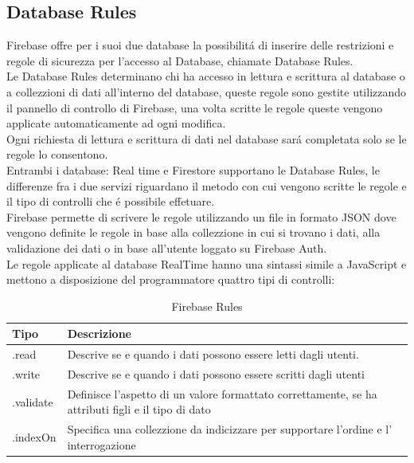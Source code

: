 \subsection{Database Rules}                 %
Firebase offre per i suoi due database la possibilit\'a di inserire delle restrizioni e regole di sicurezza per l'accesso al Database, chiamate Database Rules.\\
Le Database Rules determinano chi ha accesso in lettura e scrittura al database o a collezzioni di dati all'interno del database, queste regole sono gestite utilizzando il pannello di controllo di Firebase, una volta scritte le regole queste vengono applicate automaticamente ad ogni modifica. \\
Ogni richiesta di lettura e scrittura di dati nel database sar\'a completata solo se le regole lo consentono.\\
Entrambi i database: Real time e Firestore supportano le Database Rules, le differenze fra i due servizi riguardano il metodo con cui vengono scritte le regole e il tipo di controlli che \'e possibile effetuare.\\
Firebase permette di scrivere le regole utilizzando un file in formato JSON dove vengono definite le regole in base alla collezzione in cui si trovano i dati, alla validazione dei dati o in base all'utente loggato su Firebase Auth.\\
Le regole applicate al database RealTime hanno una sintassi simile a JavaScript e mettono a disposizione del programmatore quattro tipi di controlli:

\begin{table}[h]
\begin{center}
\begin{tabular}{|p{2cm}|p{12cm}|}
    \hline
    {\textbf{Tipo}} & {\textbf{Descrizione}} \\ \hline
    .read & Descrive se e quando i dati possono essere letti dagli utenti.\\ \hline
    .write & Descrive se e quando i dati possono essere scritti dagli utenti\\ \hline
     .validate & Definisce l'aspetto di un valore formattato correttamente, se ha attributi figli e il tipo di dato\\ \hline
    .indexOn & Specifica una collezzione da indicizzare per supportare l'ordine e l' interrogazione\\ \hline
\end{tabular}
\caption[Firbase Rules ]{Firebase Rules}\label{tab:Firebase Rules}
\end{center}
\end{table}

